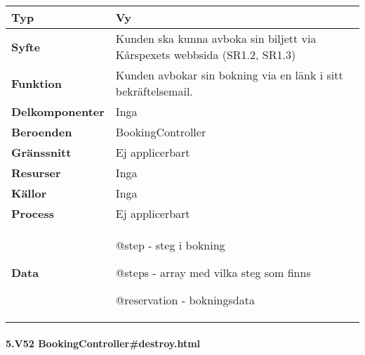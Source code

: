 \documentclass[a4paper, twoside, 11pt, titlepage]{article}
\begin{document}
			\begin {table} [ht] \begin{tabular} {  p{3.5cm} p{11.6cm} }
				\hline
				{\sffamily\textbf{Typ}} & {Vy} \\
				\hline
				{\sffamily\textbf{Syfte}} & {Kunden ska kunna avboka sin biljett via Kårspexets webbsida (SR1.2, SR1.3)} \\
				\hline
				{\sffamily\textbf{Funktion}} & {Kunden avbokar sin bokning via en länk i sitt bekräftelsemail.} \\
				\hline
				{\sffamily\textbf{Delkomponenter}} & {Inga} \\
				\hline
				{\sffamily\textbf{Beroenden}} & {BookingController} \\
				\hline
				{\sffamily\textbf{Gränssnitt}} & {Ej applicerbart} \\
				\hline
				{\sffamily\textbf{Resurser}} & {Inga} \\
				\hline
				{\sffamily\textbf{Källor}} & {Inga} \\
				\hline
				{\sffamily\textbf{Process}} & {Ej applicerbart} \\
				\hline
				{\sffamily\textbf{Data}} & {@step - steg i bokning

@steps - array med vilka steg som finns

@reservation - bokningsdata} \\
				\hline
			\end{tabular} \end{table} \FloatBarrier


			\clearpage %
			\paragraph{5.V52 BookingController\#destroy.html}\
\end{document}
